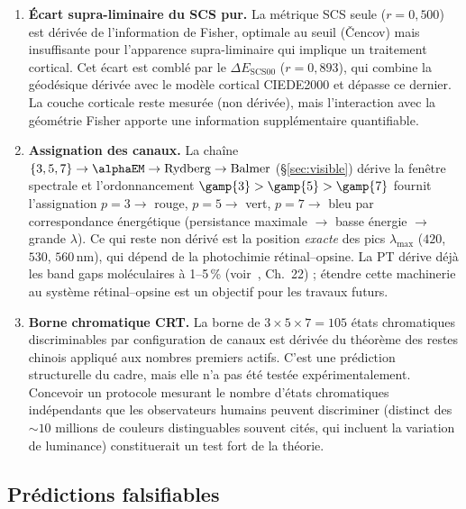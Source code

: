 \documentclass[12pt,a4paper]{article}
\begin{document}
\begin{enumerate}[nosep]
\item \textbf{\'Ecart supra-liminaire du SCS pur.} La m\'etrique SCS
  seule ($r = 0{,}500$) est d\'eriv\'ee de l'information de Fisher,
  optimale au seuil (\v{C}encov) mais insuffisante pour l'apparence
  supra-liminaire qui implique un traitement cortical. Cet \'ecart est
  combl\'e par le $\Delta E_{\mathrm{SCS00}}$ ($r = 0{,}893$), qui
  combine la g\'eod\'esique d\'eriv\'ee avec le mod\`ele cortical
  CIEDE2000 et d\'epasse ce dernier. La couche corticale reste
  mesur\'ee (non d\'eriv\'ee), mais l'interaction avec la g\'eom\'etrie
  Fisher apporte une information suppl\'ementaire quantifiable.

\item \textbf{Assignation des canaux.} La cha\^ine
  $\{3,5,7\} \to \alphaEM \to \mathrm{Rydberg} \to \mathrm{Balmer}$
  (\S\ref{sec:visible}) d\'erive la fen\^etre spectrale et
  l'ordonnancement $\gamp{3} > \gamp{5} > \gamp{7}$ fournit
  l'assignation $p=3 \to$ rouge, $p=5 \to$ vert, $p=7 \to$ bleu
  par correspondance \'energ\'etique (persistance maximale $\to$ basse
  \'energie $\to$ grande $\lambda$). Ce qui reste non d\'eriv\'e est
  la position \emph{exacte} des pics $\lambda_{\max}$ ($420$, $530$,
  $560\,\mathrm{nm}$), qui d\'epend de la photochimie r\'etinal--opsine.
  La PT d\'erive d\'ej\`a les band gaps mol\'eculaires \`a 1--5\,\%
  (voir~\cite{senez2026math}, Ch.~22) ; \'etendre cette machinerie au
  syst\`eme r\'etinal--opsine est un objectif pour les travaux futurs.

\item \textbf{Borne chromatique CRT.} La borne de
  $3 \times 5 \times 7 = 105$ \'etats chromatiques discriminables par
  configuration de canaux est d\'eriv\'ee du th\'eor\`eme des restes
  chinois appliqu\'e aux nombres premiers actifs. C'est une pr\'ediction
  structurelle du cadre, mais elle n'a pas \'et\'e test\'ee
  exp\'erimentalement. Concevoir un protocole mesurant le nombre
  d'\'etats chromatiques ind\'ependants que les observateurs humains
  peuvent discriminer (distinct des $\sim\!10$ millions de couleurs
  distinguables souvent cit\'es, qui incluent la variation de luminance)
  constituerait un test fort de la th\'eorie.
\end{enumerate}

\subsection{Pr\'edictions falsifiables}
\end{document}

